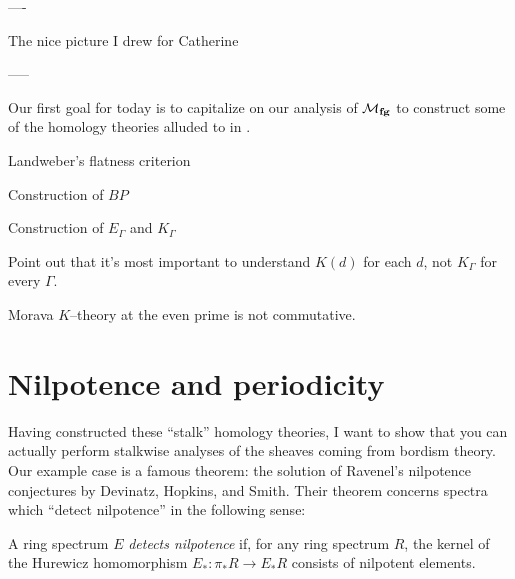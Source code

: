 
----

The nice picture I drew for Catherine

-----

Our first goal for today is to capitalize on our analysis of $\mathcal{M}_{\mathbf{fg}}$ to construct some of the homology theories alluded to in .

Landweber's flatness criterion


Construction of $BP$

Construction of $E_\Gamma$ and $K_\Gamma$

Point out that it's most important to understand $K(d)$ for each $d$, not $K_\Gamma$ for every $\Gamma$.

\begin{remark}
Morava $K$--theory at the even prime is not commutative.
\end{remark}







\section{Nilpotence and periodicity}

Having constructed these ``stalk'' homology theories, I want to show that you can actually perform stalkwise analyses of the sheaves coming from bordism theory.  Our example case is a famous theorem: the solution of Ravenel's nilpotence conjectures by Devinatz, Hopkins, and Smith.  Their theorem concerns spectra which ``detect nilpotence'' in the following sense:

\begin{definition}
A ring spectrum $E$ \textit{detects nilpotence} if, for any ring spectrum $R$, the kernel of the Hurewicz homomorphism $E_*: \pi_* R \to E_* R$ consists of nilpotent elements.
\end{definition}

